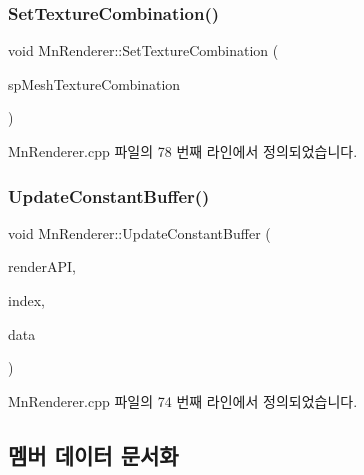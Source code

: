 \subsubsection{\texorpdfstring{Set\+Texture\+Combination()}{SetTextureCombination()}}
{\footnotesize\ttfamily void Mn\+Renderer\+::\+Set\+Texture\+Combination (\begin{DoxyParamCaption}\item[{const std\+::shared\+\_\+ptr$<$ \hyperlink{class_m_n_l_1_1_mn_mesh_texture_combination}{Mn\+Mesh\+Texture\+Combination} $>$ \&}]{sp\+Mesh\+Texture\+Combination }\end{DoxyParamCaption})}



Mn\+Renderer.\+cpp 파일의 78 번째 라인에서 정의되었습니다.

\mbox{\label{class_m_n_l_1_1_mn_renderer_a04dcf13f6f822d2c9c68469a2a0c9ad7}} 
\subsubsection{\texorpdfstring{Update\+Constant\+Buffer()}{UpdateConstantBuffer()}}
{\footnotesize\ttfamily void Mn\+Renderer\+::\+Update\+Constant\+Buffer (\begin{DoxyParamCaption}\item[{\hyperlink{class_m_n_l_1_1_mn_render_a_p_i}{Mn\+Render\+A\+PI} \&}]{render\+A\+PI,  }\item[{U\+I\+NT}]{index,  }\item[{const D3\+D11\+\_\+\+S\+U\+B\+R\+E\+S\+O\+U\+R\+C\+E\+\_\+\+D\+A\+TA \&}]{data }\end{DoxyParamCaption})}



Mn\+Renderer.\+cpp 파일의 74 번째 라인에서 정의되었습니다.



\subsection{멤버 데이터 문서화}
\mbox{\label{class_m_n_l_1_1_mn_renderer_a3d4ca55924319da2153714ed6a1f59d9}} 
